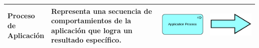 \begin{longtable}{|p{0.15\linewidth}|p{0.45\linewidth}|p{0.2\linewidth} p{0.2\linewidth}|}
    Proceso de Aplicación 
    &
    Representa una secuencia de comportamientos de la aplicación que logra un resultado específico. 
    &
\begin{center}
    \includegraphics[width=1\linewidth]{imgs/capa_aplicacion/aplication_process.pdf}
\end{center} &
\begin{center}
    \includegraphics[width=0.7\linewidth]{imgs/capa_aplicacion/process.pdf}
\end{center}
    \\ \hline


\end{longtable}
